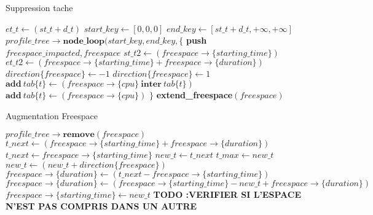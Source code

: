 \documentclass{report}
\begin{document}
\begin{algorithm}
\caption{Suppression tache}\label{Remove}
\begin{algorithmic}[1]
	\State $et\_t \gets (st\_t + d\_t)$
	\State $start\_key\gets[0, 0, 0]$
	\State $end\_key\gets[st\_t + d\_t, +\infty, +\infty]$
	\State $profile\_tree\rightarrow \textbf{node\_loop}(start\_key, end\_key, \{$
		\State \textbf{push} $freespace\_impacted, freespace$
		\State $st\_t2\gets (freespace\rightarrow\{starting\_time\})$
		\State $et\_t2\gets (freespace\rightarrow\{starting\_time\} + freespace\rightarrow\{duration\})$
			\State $direction\{freespace\} \gets -1$
			\State $direction\{freespace\} \gets 1$
		\EndIf
					\State $\textbf{add}\ tab\{t\}\gets (freespace\rightarrow\{cpu\}\ \textbf{inter}\ tab\{t\})$
				\Else
					\State $\textbf{add}\ tab\{t\}\gets (freespace\rightarrow\{cpu\})$
				\EndIf
			\EndFor
		\EndIf
	\State $\}$
		\State \textbf{extend\_freespace}$(freespace)$
	\EndFor
\EndFunction
\end{algorithmic}
\end{algorithm}

\begin{algorithm}
\caption{Augmentation Freespace}\label{extend_freespace}
\begin{algorithmic}[1]
	\State $profile\_tree\rightarrow \textbf{remove}(freespace)$
		\State $t\_next \gets (freespace\rightarrow\{starting\_time\} + freespace\rightarrow\{duration\} )$
	\Else
		\State $t\_next \gets freespace\rightarrow\{starting\_time\} $
	\EndIf
	\State $new\_t \gets t\_next$
		\State $t\_max \gets new\_t$
		\State $new\_t \gets (new\_t + direction\{freespace\})$
	\EndWhile
		\State $freespace\rightarrow\{duration\} \gets (t\_next - freespace\rightarrow\{starting\_time\})$
	\Else
		\State $freespace\rightarrow\{duration\} \gets (freespace\rightarrow\{starting\_time\} - new\_t + freespace\rightarrow\{duration\})$
		\State $freespace\rightarrow\{starting\_time\} \gets new\_t$
	\EndIf
	\State \textbf{TODO :VERIFIER SI L'ESPACE N'EST PAS COMPRIS DANS UN AUTRE}
\EndFunction
\end{algorithmic}
\end{algorithm}
\end{document}
